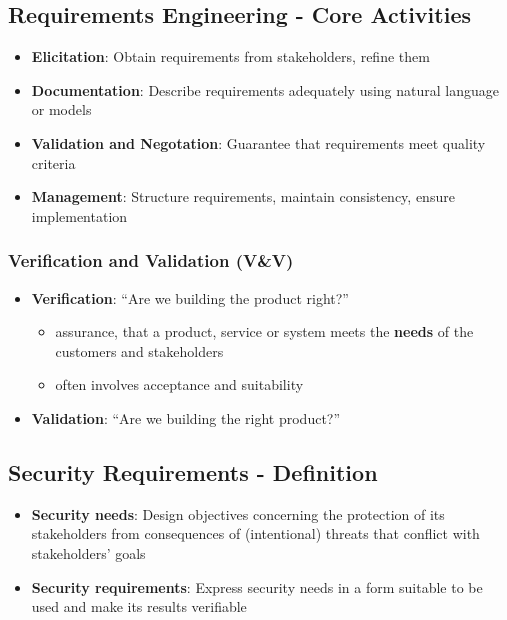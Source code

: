 \documentclass[12pt,A4]{extarticle}
\begin{document}
\subsection{Requirements Engineering - Core Activities}
\begin{itemize}
  \item{\textbf{Elicitation}: Obtain requirements from stakeholders, refine them}
  \item{\textbf{Documentation}: Describe requirements adequately using natural language or models}
  \item{\textbf{Validation and Negotation}: Guarantee that requirements meet quality criteria}
  \item{\textbf{Management}: Structure requirements, maintain consistency, ensure implementation}
\end{itemize}

\subsubsection{Verification and Validation (V\&V)}
\begin{itemize}
  \item{\textbf{Verification}: ``Are we building the product right?'' \cite{boehm1981software}
    \begin{itemize}
      \item{assurance, that a product, service or system meets the \textbf{needs} of the customers and stakeholders}
      \item{often involves acceptance and suitability}
    \end{itemize}
  }
  \item{\textbf{Validation}: ``Are we building the right product?'' \cite{boehm1981software}}
\end{itemize}

\subsection{Security Requirements - Definition}
\begin{itemize}
  \item{\textbf{Security needs}: Design objectives concerning the protection of its stakeholders from consequences of (intentional) threats that conflict with stakeholders' goals}
  \item{\textbf{Security requirements}: Express security needs in a form suitable to be used and make its results verifiable}
\end{itemize}
\end{document}
